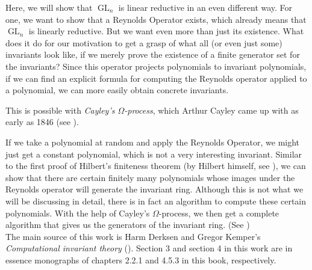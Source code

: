 Here, we will show that $\operatorname{GL}_n$ is linear reductive in an even different way.
For one, we want to show that a Reynolds Operator exists, which already means that $\operatorname{GL}_n$ is linearly reductive.
But we want even more than just its existence.
What does it do for our motivation to get a grasp of what all (or even just some) invariants look like, if we merely prove the existence of a finite generator set for the invariants?
Since this operator projects polynomials to invariant polynomials, if we can find an explicit formula for computing the Reynolds operator applied to a polynomial, we can more easily obtain concrete invariants.

This is possible with \textit{Cayley's $\Omega$-process}, which Arthur Cayley came up with as early as 1846 (see \cite{Cay46}).

If we take a polynomial at random and apply the Reynolds Operator, we might just get a constant polynomial, which is not a very interesting invariant.
Similar to the first proof of Hilbert's finiteness theorem (by Hilbert himself, see \cite[p.41,42]{DK15}), we can show that there are certain finitely many polynomials whose images under the Reynolds operator will generate the invariant ring.
Although this is not what we will be discussing in detail, there is in fact an algorithm to compute these certain polynomials.
With the help of Cayley's $\Omega$-process, we then get a complete algorithm that gives us the generators of the invariant ring.
(See \cite[4.1.9]{DK15})  \\
The main source of this work is Harm Derksen and Gregor Kemper's \textit{Computational invariant theory} ({\cite{DK15}}).
Section 3 and section 4 in this work are in essence monographs of chapters 2.2.1 and 4.5.3 in this book, respectively.

